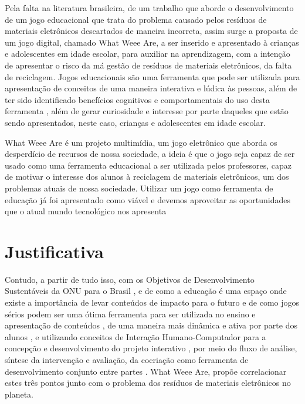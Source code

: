 \par
Pela falta na literatura brasileira, de um trabalho que aborde o desenvolvimento de um jogo educacional que trata do problema causado pelos resíduos de materiais eletrônicos descartados de maneira incorreta, assim surge a proposta de um jogo digital, chamado What Weee Are, a ser inserido e apresentado à crianças e adolescentes em idade escolar, para auxiliar na aprendizagem, com a intenção de apresentar o risco da má gestão de resíduos de materiais eletrônicos, da falta de reciclagem. Jogos educacionais são uma ferramenta que pode ser utilizada para apresentação de conceitos de uma maneira interativa e lúdica às pessoas, além de ter sido identificado benefícios cognitivos e comportamentais do uso desta ferramenta \cite{gameUseOnSchool}, além de gerar curiosidade e interesse por parte daqueles que estão sendo apresentados, neste caso, crianças e adolescentes em idade escolar. \cite{savi2008jogos} 
\par
What Weee Are é um projeto multimídia, um jogo eletrônico que aborda os desperdício de recursos de nossa sociedade, a ideia é que o jogo seja capaz de ser usado como uma ferramenta educacional a ser utilizada pelos professores, capaz de motivar o interesse dos alunos à reciclagem de materiais eletrônicos, um dos problemas atuais de nossa sociedade. Utilizar um jogo como ferramenta de educação já foi apresentado como viável e devemos aproveitar as oportunidades que o atual mundo tecnológico nos apresenta \cite{gameUseOnSchool}


\section{Justificativa}
\label{Justificativa}
Contudo, a partir de tudo isso, com os Objetivos de Desenvolvimento Sustentáveis da ONU para o Brasil \cite{odsbrasil}, e de como a educação é uma espaço onde existe a importância de levar conteúdos de impacto para o futuro e de como jogos sérios podem ser uma ótima ferramenta para ser utilizada no ensino e apresentação de conteúdos \cite{gameUseOnSchool}, de uma maneira mais dinâmica e ativa por parte dos alunos \cite{savi2008jogos}, e utilizando conceitos de Interação Humano-Computador para a concepção e desenvolvimento do projeto interativo \cite{IHC_Estendido}, por meio do fluxo de análise, síntese da intervenção e avaliação, da cocriação como ferramenta de desenvolvimento conjunto entre partes \cite{lowthorpe2013stop}. What Weee Are, propõe correlacionar estes três pontos junto com o problema dos resíduos de materiais eletrônicos no planeta.

